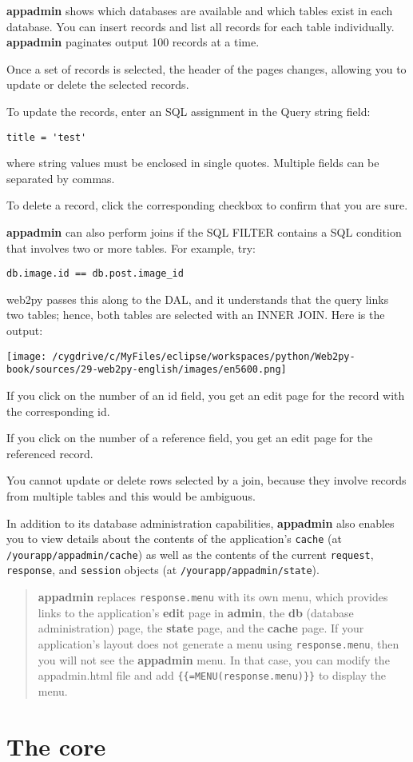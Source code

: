 \documentclass[justified,sixbynine,notoc]{tufte-book}
\def\ft{\small\tt}
\begin{document}
\begin{fullwidth}
{\bf appadmin} shows which databases are available and which tables exist in each database. You can insert records and list all records for each table individually. {\bf appadmin} paginates output 100 records at a time.

Once a set of records is selected, the header of the pages changes, allowing you to update or delete the selected records.

To update the records, enter an SQL assignment in the Query string field:
\begin{lstlisting}
title = 'test'
\end{lstlisting}
\noindent where string values must be enclosed in single quotes. Multiple fields can be separated by commas.

To delete a record, click the corresponding checkbox to confirm that you are sure.

{\bf appadmin} can also perform joins if the SQL FILTER contains a SQL condition that involves two or more tables. For example, try:
\begin{lstlisting}
db.image.id == db.post.image_id
\end{lstlisting}
\noindent web2py passes this along to the DAL, and it understands that the query links two tables; hence, both tables are selected with an INNER JOIN. Here is the output:


\goodbreak\begin{center}\texttt{[image: /cygdrive/c/MyFiles/eclipse/workspaces/python/Web2py-book/sources/29-web2py-english/images/en5600.png]}\end{center}


If you click on the number of an id field, you get an edit page for the record with the corresponding id.

If you click on the number of a reference field, you get an edit page for the referenced record.

You cannot update or delete rows selected by a join, because they involve records from multiple tables and this would be ambiguous.

In addition to its database administration capabilities, {\bf appadmin} also enables you to view details about the contents of the application's {\ft cache} (at {\ft /yourapp/appadmin/cache}) as well as the contents of the current {\ft request}, {\ft response}, and {\ft session} objects (at {\ft /yourapp/appadmin/state}).

\begin{quote}{\bf appadmin} replaces {\ft response.menu} with its own menu, which provides links to the application's {\bf edit} page in {\bf admin}, the {\bf db} (database administration) page, the {\bf state} page, and the {\bf cache} page. If your application's layout does not generate a menu using {\ft response.menu}, then you will not see the {\bf appadmin} menu. In that case, you can modify the appadmin.html file and add {\ft \{\{=MENU(response.menu)\}\}} to display the menu.\end{quote}
\goodbreak\chapter{The core}


\end{fullwidth}
\end{document}
